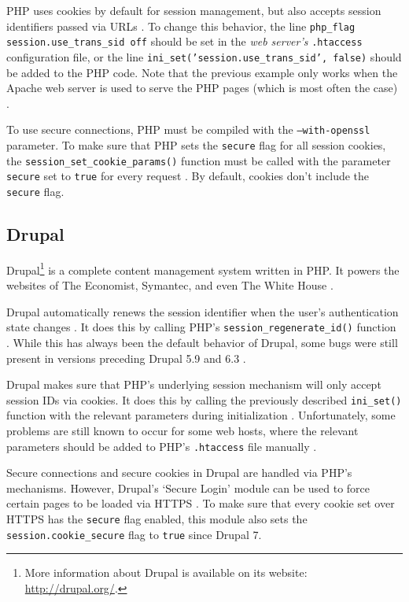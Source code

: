 PHP uses cookies by default for session management, but also accepts session identifiers passed via URLs  \cite{Holovaty2008}. To change this behavior, the line \texttt{php\_flag session.use\_trans\_sid\ off} should be set in the \emph{web server's} \texttt{.htaccess} configuration file, or the line \texttt{ini\_set('session.use\_trans\_sid', false)} should be added to the PHP code. Note that the previous example only works when the Apache web server is used to serve the PHP pages (which is most often the case) \cite{PHPdisableURL}.

To use secure connections, PHP must be compiled with the \texttt{--with-openssl} parameter. To make sure that PHP sets the \texttt{secure} flag for all session cookies, the \texttt{session\_set\_cookie\_params()} function must be called with the parameter \texttt{secure} set to \texttt{true} for every request \cite{PHPsessionCookieParams}. By default, cookies don't include the \texttt{secure} flag.

\subsection{Drupal}

Drupal\footnote{More information about Drupal is available on its website: \url{http://drupal.org/}.} is a complete content management system written in PHP. It powers the websites of The Economist, Symantec, and even The White House \cite{DrupalCases,DrupalWhiteHouse}.

Drupal automatically renews the session identifier when the user's authentication state changes \cite{DrupalAuth}. It does this by calling PHP's \texttt{session\_regenerate\_id()} function \cite{DrupalRegenerate}. While this has always been the default behavior of Drupal, some bugs were still present in versions preceding Drupal 5.9 and 6.3 \cite{DrupalBug}.

Drupal makes sure that PHP's underlying session mechanism will only accept session IDs via cookies. It does this by calling the previously described \texttt{ini\_set()} function with the relevant parameters during initialization \cite{DrupalSettings}. Unfortunately, some problems are still known to occur for some web hosts, where the relevant parameters should be added to PHP's \texttt{.htaccess} file manually \cite{DrupalSIDurl}.

Secure connections and secure cookies in Drupal are handled via PHP's mechanisms. However, Drupal's `Secure Login' module can be used to force certain pages to be loaded via HTTPS \cite{DrupalSecureLogin}. To make sure that every cookie set over HTTPS has the \texttt{secure} flag enabled, this module also sets the \texttt{session.cookie\_secure} flag to \texttt{true} since Drupal 7.


